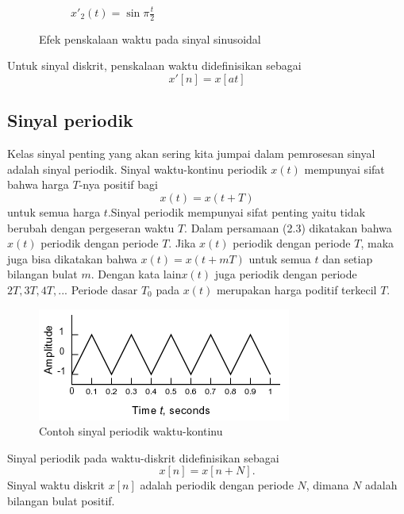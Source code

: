 \begin{enumerate}
\begin{figure}[!h]
\begin{subfigure}[b]{0.4\textwidth}
\caption{$x'_2(t)=\sin \pi \frac{t}{2}$}
\end{subfigure}
\caption{Efek penskalaan waktu pada sinyal sinusoidal}
\end{figure}

Untuk sinyal diskrit, penskalaan waktu didefinisikan sebagai
\begin{equation}
x'[n]=x[at]
\end{equation} 
\end{enumerate}
\subsection{Sinyal periodik}
Kelas sinyal penting yang akan sering kita jumpai dalam pemrosesan sinyal adalah sinyal periodik. Sinyal waktu-kontinu periodik $x(t)$ mempunyai sifat bahwa harga $T$-nya positif bagi
\begin{equation}
x(t) = x(t+T)
\end{equation}
untuk semua harga $t$.Sinyal periodik mempunyai sifat penting yaitu tidak berubah dengan pergeseran waktu $T$. Dalam persamaan (2.3) dikatakan bahwa $x(t)$ periodik dengan periode $T$. Jika $x(t)$ periodik dengan periode $T$, maka juga bisa dikatakan bahwa $x(t)=x(t+mT)$ untuk semua $t$ dan setiap bilangan bulat $m$. Dengan kata lain$x(t)$ juga periodik dengan periode $2T, 3T, 4T, ...$ Periode dasar $T_0$ pada $x(t)$ merupakan harga poditif terkecil $T$.

\begin{figure}[!h]
\centering
\includegraphics[scale=0.9]{pict/periodik}
\caption{Contoh sinyal periodik waktu-kontinu}
\end{figure}

Sinyal periodik pada waktu-diskrit didefinisikan sebagai
\begin{equation}
x[n]=x[n+N].
\end{equation}
Sinyal waktu diskrit $x[n]$ adalah periodik dengan periode $N$, dimana $N$ adalah bilangan bulat positif. 

